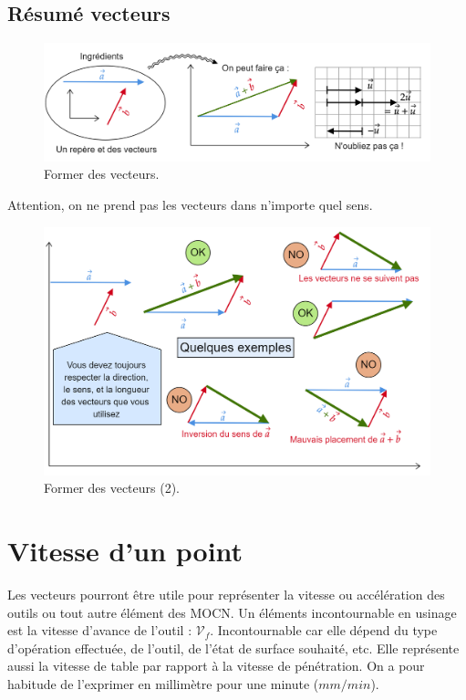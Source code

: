 \documentclass[
	11pt, %
	fleqn, %
	a4paper, %
]{LegrandOrangeBook}
\begin{document}
\subsection{Résumé vecteurs}

\begin{figure}[H] %
	\centering %
	\includegraphics[width=1\textwidth]{Images/vec10.png} %
	\caption{Former des vecteurs.}
	\label{vec10} %
\end{figure}

Attention, on ne prend pas les vecteurs dans n'importe quel sens.

\begin{figure}[H] %
	\centering %
	\includegraphics[width=1\textwidth]{Images/vec11.png} %
	\caption{Former des vecteurs (2).}
	\label{vec11} %
\end{figure}


\section{Vitesse d'un point}
Les vecteurs pourront être utile pour représenter la vitesse ou accélération des outils ou tout autre élément des MOCN. Un éléments incontournable en usinage est la vitesse d'avance de l'outil : $\mathcal{V}_f$. Incontournable car elle dépend du type d'opération effectuée, de l'outil, de l'état de surface souhaité, etc. Elle représente aussi la vitesse de table par rapport à la vitesse de pénétration. On a pour habitude de l'exprimer en millimètre pour une minute ($mm/min$).
\end{document}
